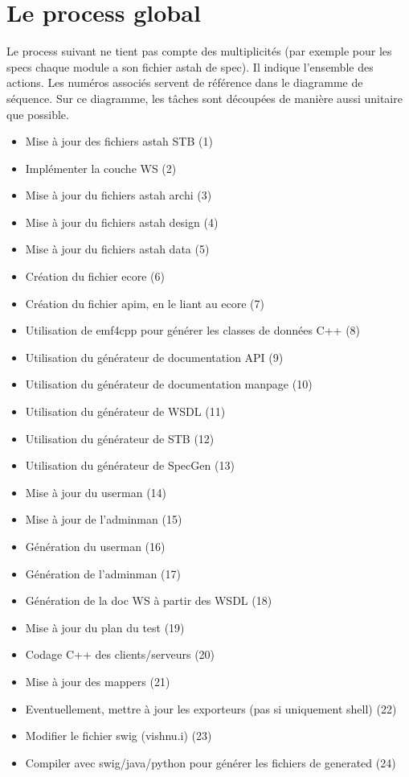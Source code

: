 \documentclass{article}
\begin{document}
\section*{Le process global} 
Le process suivant ne tient pas compte des multiplicités (par exemple pour les specs chaque module a son fichier astah de spec). Il indique l'ensemble des actions.
Les numéros associés servent de référence dans le diagramme de séquence. Sur ce diagramme, les tâches sont découpées de manière aussi unitaire que possible.
\begin{itemize}
\item Mise à jour des fichiers astah STB (1)
\item Implémenter la couche WS (2)
\item Mise à jour du fichiers astah archi (3)
\item Mise à jour du fichiers astah design (4)
\item Mise à jour du fichiers astah data (5)
\item Création du fichier ecore (6)
\item Création du fichier apim, en le liant au ecore (7)
\item Utilisation de emf4cpp pour générer les classes de données C++ (8)
\item Utilisation du générateur de documentation API (9)
\item Utilisation du générateur de documentation manpage (10)
\item Utilisation du générateur de WSDL (11)
\item Utilisation du générateur de STB (12)
\item Utilisation du générateur de SpecGen (13)
\item Mise à jour du userman (14)
\item Mise à jour de l'adminman (15)
\item Génération du userman (16)
\item Génération de l'adminman (17)
\item Génération de la doc WS à partir des WSDL (18)
\item Mise à jour du plan du test (19)
\item Codage C++ des clients/serveurs (20)
\item Mise à jour des mappers (21)
\item Eventuellement, mettre à jour les exporteurs (pas si uniquement shell) (22)
\item Modifier le fichier swig (vishnu.i) (23)
\item Compiler avec swig/java/python pour générer les fichiers de generated (24)

\end{itemize}
\end{document}
